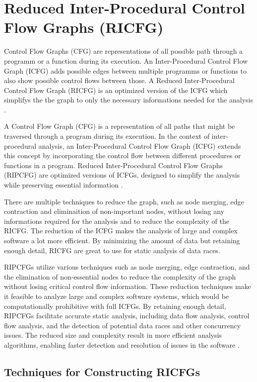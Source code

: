 \documentclass[
fancyheadings, %
%
%
]{stsreprt}
\begin{document}
{		
		\section{Reduced Inter-Procedural Control Flow Graphs (RICFG)}
		Control Flow Graphs (CFG) are representations of all possible path through a programm or a function during its execution. An Inter-Procedural Control Flow Graph (ICFG) adds possible edges between multiple programms or functions to also show possible control flows between those. A Reduced Inter-Procedural Control Flow Graph (RICFG) is an optimized version of the ICFG which simplifys the the graph to only the necessary informations needed for the analysis \cite{engler2003}.
		
		
		A Control Flow Graph (CFG) is a representation of all paths that might be traversed through a program during its execution. In the context of inter-procedural analysis, an Inter-Procedural Control Flow Graph (ICFG) extends this concept by incorporating the control flow between different procedures or functions in a program. Reduced Inter-Procedural Control Flow Graphs (RIPCFG) are optimized versions of ICFGs, designed to simplify the analysis while preserving essential information \cite{engler2003}.
		
		There are multiple techniques to reduce the graph, such as node merging, edge contraction and eliminaition of non-important nodes, without losing any informations required for the analysis and to reduce the complexity of the RICFG. The reduction of the ICFG makes the analysis of large and complex software a lot more efficient. By minimizing the amount of data but retaining enough detail, RICFG are great to use for static analysis of data races. 
		
		RIPCFGs utilize various techniques such as node merging, edge contraction, and the elimination of non-essential nodes to reduce the complexity of the graph without losing critical control flow information. These reduction techniques make it feasible to analyze large and complex software systems, which would be computationally prohibitive with full ICFGs. By retaining enough detail, RIPCFGs facilitate accurate static analysis, including data flow analysis, control flow analysis, and the detection of potential data races and other concurrency issues. The reduced size and complexity result in more efficient analysis algorithms, enabling faster detection and resolution of issues in the software \cite{wang2020}.
		
		\subsection{Techniques for Constructing RICFGs}
		
}
\end{document}
